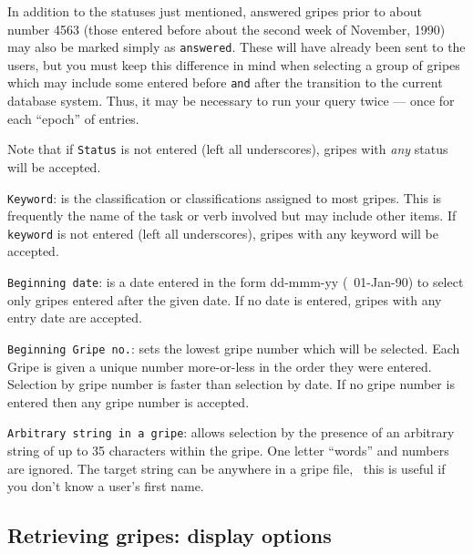In addition to the statuses just mentioned, answered gripes prior to
about number 4563 (those entered before about the second week of
November, 1990) may also be marked simply as {\tt answered}. These
will have already been sent to the users, but you must keep this
difference in mind when selecting a group of gripes which may include
some entered before {\tt and} after the transition to the current
database system. Thus, it may be necessary to run your query twice ---
once for each ``epoch'' of entries.

Note that if {\tt Status} is not entered (left all underscores),
gripes with {\it any} status will be accepted.

{\tt Keyword}: is the classification or classifications assigned to
most gripes.  This is frequently the name of the task or verb involved
but may include other items.  If {\tt keyword} is not entered (left
all underscores), gripes with any keyword will be accepted.

{\tt Beginning date}: is a date entered in the form dd-mmm-yy (\eg\
01-Jan-90) to select only gripes entered after the given date.  If
no date is entered, gripes with any entry date are accepted.

{\tt Beginning Gripe no.}: sets the lowest gripe number which will be
selected.  Each Gripe is given a unique number more-or-less in the
order they were entered.  Selection by gripe number is faster than
selection by date.  If no gripe number is entered then any gripe
number is accepted.

{\tt Arbitrary string in a gripe}: allows selection by the presence of
an arbitrary string of up to 35 characters within the gripe.  One
letter ``words'' and numbers are ignored.  The target string can be
anywhere in a gripe file, \eg\ this is useful if you don't know a
user's first name.

\subsection{Retrieving gripes: display options}

